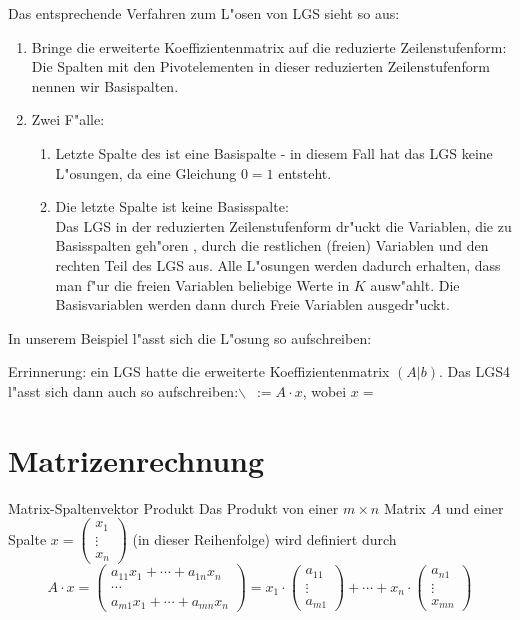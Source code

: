\documentclass[oneside,fontsize=11pt,paper=a4,BCOR=0mm,DIV=12,automark,headsepline]{scrbook}
\theoremstyle{remark}
\theoremstyle{definition}
\theoremstyle{definition}
\theoremstyle{remark}
\begin{document}
Das entsprechende Verfahren zum L"osen von LGS sieht so aus:
\begin{relation}
\begin{enumerate}
\item Bringe die erweiterte Koeffizientenmatrix auf die reduzierte
Zeilenstufenform: \\
Die Spalten mit den Pivotelementen in dieser reduzierten Zeilenstufenform
nennen wir Basispalten.
\item Zwei F"alle:
\begin{enumerate}
\item Letzte Spalte des ist eine Basispalte - in diesem Fall hat das LGS keine
L"osungen, da eine Gleichung \(0=1\) entsteht.
\item Die letzte Spalte ist keine Basisspalte: \\
Das LGS in der reduzierten Zeilenstufenform dr"uckt die Variablen, die zu
Basisspalten geh"oren , durch die restlichen (freien) Variablen und den
rechten Teil des LGS aus. Alle L"osungen werden dadurch erhalten, dass
man f"ur die freien Variablen beliebige Werte in \(K\) ausw"ahlt. Die
Basisvariablen werden dann durch Freie Variablen ausgedr"uckt.
\end{enumerate}
\end{enumerate}
\end{relation}

In unserem Beispiel l"asst sich die L"osung so aufschreiben: 


Errinnerung: ein LGS hatte die erweiterte Koeffizientenmatrix \((A|b)\). Das LGS4
l"asst sich dann auch so aufschreiben:$\backslash$\ \(:=A\cdot x\), wobei \(x=\)


\section{Matrizenrechnung}
\label{sec:org0f3e63e}
\begin{definition}{Matrix-Spaltenvektor Produkt}{}
Das Produkt von einer \(m\times n\) Matrix \(A\) und einer Spalte \(x=\begin{pmatrix}
x_1\\\vdots\\x_n
\end{pmatrix}\) (in dieser
Reihenfolge) wird definiert durch \[A\cdot x = 
\begin{pmatrix}
a_{11}x_1 + \cdots + a_{1n}x_n \\
\cdots \\
a_{m1}x_1 + \cdots + a_{mn}x_n
\end{pmatrix}
=x_1\cdot\begin{pmatrix}
a_{11}\\\vdots\\a_{m1}
\end{pmatrix} + \cdots + 
x_n\cdot\begin{pmatrix}
a_{n1}\\\vdots\\x_{mn}
\end{pmatrix}
\]
\end{definition}
\end{document}
